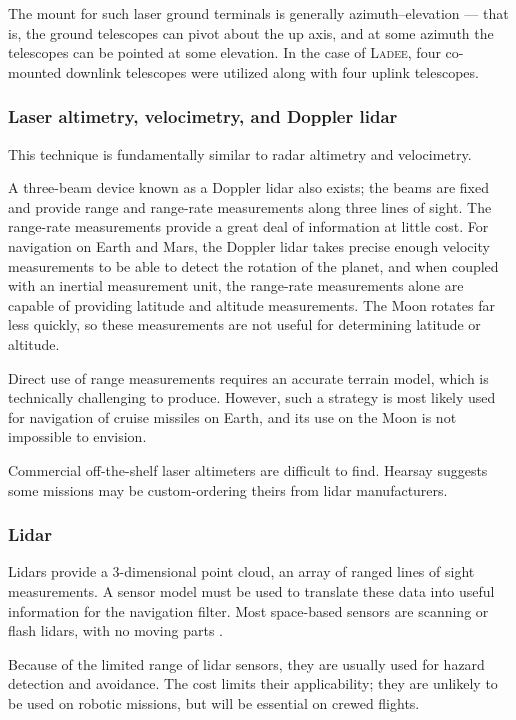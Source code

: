 \documentclass[12pt]{article}
\begin{document}
The mount for such laser ground terminals is generally azimuth--elevation --- that is, the ground telescopes can pivot about the up axis, and at some azimuth the telescopes can be pointed at some elevation. In the case of \textsc{Ladee}, four co-mounted downlink telescopes were utilized along with four uplink telescopes. \citep{Murphy2014}

\subsubsection{Laser altimetry, velocimetry, and Doppler lidar}
This technique is fundamentally similar to radar altimetry and velocimetry.

A three-beam device known as a Doppler lidar also exists; the beams are fixed and provide range and range-rate measurements along three lines of sight. The range-rate measurements provide a great deal of information at little cost. For navigation on Earth and Mars, the Doppler lidar takes precise enough velocity measurements to be able to detect the rotation of the planet, and when coupled with an inertial measurement unit, the range-rate measurements alone are capable of providing latitude and altitude measurements. The Moon rotates far less quickly, so these measurements are not useful for determining latitude or altitude.

Direct use of range measurements requires an accurate terrain model, which is technically challenging to produce. However, such a strategy is most likely used for navigation of cruise missiles on Earth, and its use on the Moon is not impossible to envision.

Commercial off-the-shelf laser altimeters are difficult to find. Hearsay suggests some missions may be custom-ordering theirs from lidar manufacturers.

\subsubsection{Lidar}
Lidars provide a 3-dimensional point cloud, an array of ranged lines of sight measurements. A sensor model must be used to translate these data into useful information for the navigation filter. Most space-based sensors are scanning or flash lidars, with no moving parts \citep{Christian2013}.

Because of the limited range of lidar sensors, they are usually used for hazard detection and avoidance. The cost limits their applicability; they are unlikely to be used on robotic missions, but will be essential on crewed flights.
\end{document}
